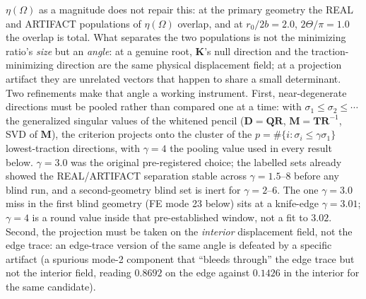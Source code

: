 \documentclass[11pt]{article}
\begin{document}
$\eta(\Omega)$ as a magnitude does not repair this: at the primary geometry the
REAL and ARTIFACT populations of $\eta(\Omega)$ overlap, and at $r_0/2b=2.0$,
$2\Theta/\pi=1.0$ the overlap is total. What separates the two populations
is not the minimizing ratio's \emph{size} but an \emph{angle}: at a
genuine root, $\mathbf{K}$'s null direction and the traction-minimizing direction
are the same physical displacement field; at a projection artifact they
are unrelated vectors that happen to share a small determinant. Two
refinements make that angle a working instrument. First, near-degenerate
directions must be pooled rather than compared one at a time: with
$\sigma_1\le\sigma_2\le\cdots$ the generalized singular values of the
whitened pencil ($\mathbf{D}=\mathbf{Q}\mathbf{R}$,
$\mathbf{M}=\mathbf{T}\mathbf{R}^{-1}$, SVD of $\mathbf{M}$), the criterion
projects onto the cluster of the
$p=\#\{i:\sigma_i\le\gamma\sigma_1\}$ lowest-traction
directions, with $\gamma=4$ the pooling value used in every result below.
$\gamma=3.0$ was the original pre-registered choice; the labelled sets already
showed the REAL/ARTIFACT separation stable across $\gamma=1.5$--$8$ before any
blind run, and a second-geometry blind set is inert for $\gamma=2$--$6$.
The one $\gamma=3.0$ miss in the first blind geometry (FE mode 23 below) sits
at a knife-edge $\gamma=3.01$; $\gamma=4$ is a round value inside that
pre-established window, not a fit to $3.02$. Second, the projection must be
taken on the \emph{interior} displacement field, not the edge trace: an
edge-trace version of the same angle is defeated by a specific artifact
(a spurious mode-2 component that ``bleeds through'' the edge trace but
not the interior field, reading $0.8692$ on the edge against $0.1426$ in
the interior for the same candidate).
\end{document}
